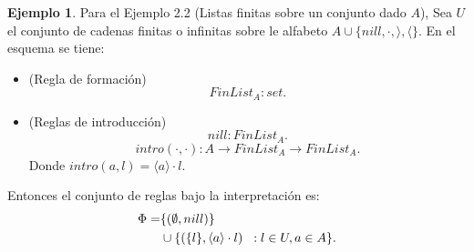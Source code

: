 \documentclass[11pt,oneside]{report}
\theoremstyle{plain}
\theoremstyle{definition}
\newtheorem{ejemplo}{Ejemplo}[chapter]
\begin{document}
\begin{ejemplo}
    Para el Ejemplo 2.2 (Listas finitas sobre un conjunto dado $A$), Sea $U$ el conjunto de cadenas finitas o infinitas sobre le alfabeto $A\cup\{nill, \cdot, \rangle, \langle\}$. En el esquema se tiene:
    \begin{itemize}
        \item (Regla de formación)
              $$FinList_A : set.$$
        \item (Reglas de introducción)
              $$nill:FinList_A.$$
              $$intro(\cdot,\cdot):A \to FinList_A\to FinList_A.$$
              Donde $intro(a,l) = \langle a\rangle\cdot l$.
    \end{itemize}

    Entonces el conjunto de reglas bajo la interpretación es:
    \begin{align*}
        \Phi = & \{(\emptyset, nill)\}\\
               & \cup \{(\{l\}, \langle a\rangle\cdot l)\hspace{2mm}: l \in U, a\in A\}
    .\end{align*}
\end{ejemplo}
\end{document}

